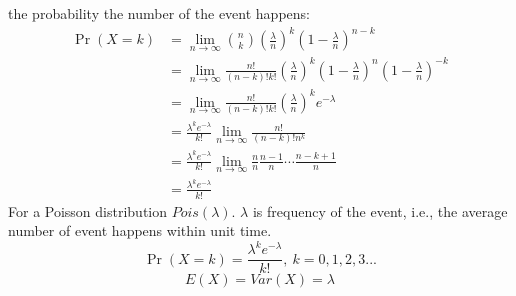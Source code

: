 \documentclass[11pt,a4paper]{article}
\begin{document}
the probability the number of the event happens:
\begin{equation}
    \begin{aligned}
        \Pr(X=k)&=\lim_{n \rightarrow\infty} \binom{n}{k} (\frac{\lambda}{n})^k(1-\frac{\lambda}{n})^{n-k}\\
        &=\lim_{n \rightarrow\infty} \frac{n!}{(n-k)!k!} (\frac{\lambda}{n})^k(1-\frac{\lambda}{n})^{n}(1-\frac{\lambda}{n})^{-k}\\
        &=\lim_{n \rightarrow\infty}\frac{n!}{(n-k)!k!} (\frac{\lambda}{n})^k e^{-\lambda}\\
        &=\frac{\lambda^k e^{-\lambda}}{k!}\lim_{n \rightarrow\infty}\frac{n!}{(n-k)!n^k}\\
        &=\frac{\lambda^k e^{-\lambda}}{k!}\lim_{n \rightarrow\infty}
        \frac{n}{n}\frac{n-1}{n}\cdots \frac{n-k+1}{n}\\
        &=\frac{\lambda^k e^{-\lambda}}{k!}
    \end{aligned}
    \nonumber
\end{equation}
For a Poisson distribution $Pois(\lambda)$. $\lambda$ is frequency of the event, i.e., the average number of event happens within unit time.
$$\Pr(X{=}k)= \frac{\lambda^k e^{-\lambda}}{k!},\ k=0,1,2,3...$$
$$E(X)=Var(X)=\lambda$$
\end{document}
